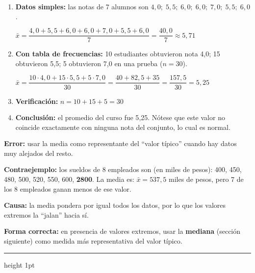 \documentclass[11pt, letterpaper]{article}
\newcommand{\subbloque}[1]{%
  \vspace{14pt}
  \noindent{\large\bfseries\color{zenitnavy} #1}\par
  \vspace{4pt}\hrule height 1pt\vspace{8pt}}
\begin{document}
\begin{tcolorbox}[examplebox, title={Ej. 7. Media aritm\'etica con datos simples y con frecuencia}]
\begin{enumerate}[label=\textbf{Paso \arabic*.}]
  \item \textbf{Datos simples:} las notas de 7 alumnos son $4{,}0;\; 5{,}5;\; 6{,}0;\; 6{,}0;\; 7{,}0;\; 5{,}5;\; 6{,}0$.

  \medskip
  $\bar{x} = \dfrac{4{,}0 + 5{,}5 + 6{,}0 + 6{,}0 + 7{,}0 + 5{,}5 + 6{,}0}{7} = \dfrac{40{,}0}{7} \approx 5{,}71$

  \medskip
  \item \textbf{Con tabla de frecuencias:} 10 estudiantes obtuvieron nota 4{,}0; 15 obtuvieron 5{,}5; 5 obtuvieron 7{,}0 en una prueba ($n = 30$).

  \medskip
  $\bar{x} = \dfrac{10 \cdot 4{,}0 + 15 \cdot 5{,}5 + 5 \cdot 7{,}0}{30} = \dfrac{40 + 82{,}5 + 35}{30} = \dfrac{157{,}5}{30} = 5{,}25$

  \medskip
  \item \textbf{Verificaci\'on:} $n = 10 + 15 + 5 = 30$ \checkmark

  \medskip
  \item \textbf{Conclusi\'on:} el promedio del curso fue 5{,}25. Nótese que este valor no coincide exactamente con ninguna nota del conjunto, lo cual es normal.
\end{enumerate}
\end{tcolorbox}

\begin{tcolorbox}[warningbox, title={Error frecuente: la media distorsionada por valores extremos (\textit{outliers})}]
\textbf{Error:} usar la media como representante del ``valor t\'ipico'' cuando hay datos muy alejados del resto.

\medskip
\textbf{Contraejemplo:} los sueldos de 8 empleados son (en miles de pesos): 400, 450, 480, 500, 520, 550, 600, \textbf{2800}. La media es:
$\bar{x} = 537{,}5$ miles de pesos, pero 7 de los 8 empleados ganan menos de ese valor.

\medskip
\textbf{Causa:} la media pondera por igual todos los datos, por lo que los valores extremos la ``jalan'' hacia s\'i.

\medskip
\textbf{Forma correcta:} en presencia de valores extremos, usar la \textbf{mediana} (secci\'on siguiente) como medida m\'as representativa del valor t\'ipico.
\end{tcolorbox}

\subbloque{4.2 Mediana y moda}
\label{sub:4.2}
\end{document}
